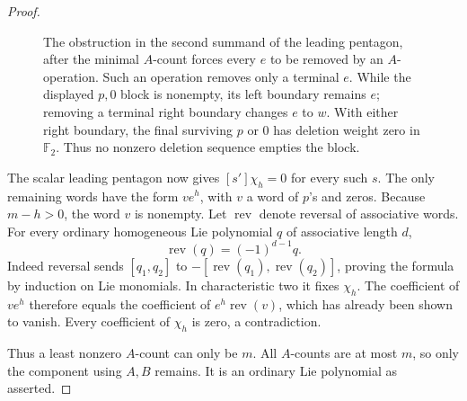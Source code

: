 \documentclass[11pt]{article}
\theoremstyle{definition}
\theoremstyle{remark}
\numberwithin{equation}{section}
\begin{document}
\begin{proof}
\begin{figure}[tbp]
  \caption{The obstruction in the second summand of the leading pentagon,
  after the minimal $A$-count forces every $e$ to be removed by an
  $A$-operation. Such an operation removes only a terminal $e$.
  While the displayed $p,0$ block is nonempty, its left boundary remains
  $e$; removing a terminal right boundary changes $e$ to $w$.
  With either right boundary, the final surviving $p$ or $0$ has deletion weight
  zero in $\mathbb F_2$. Thus no nonzero deletion sequence empties the block.}
  \label{fig:deletion-block}
\end{figure}


The scalar leading pentagon now gives $[s']\chi_h=0$ for every such
$s$.  The only remaining words have the form $v e^h$, with $v$ a word
of $p$'s and zeros.  Because $m-h>0$, the word $v$ is nonempty.  Let
$\operatorname{rev}$ denote reversal of associative words.  For every
ordinary homogeneous Lie polynomial $q$ of associative length $d$,
\[
 \operatorname{rev}(q)=(-1)^{d-1}q.
\]
Indeed reversal sends $[q_1,q_2]$ to
$-[\operatorname{rev}(q_1),\operatorname{rev}(q_2)]$, proving the
formula by induction on Lie monomials.  In characteristic two it fixes
$\chi_h$.  The coefficient of $v e^h$ therefore equals the coefficient
of $e^h\operatorname{rev}(v)$, which has already been shown to vanish.
Every coefficient of $\chi_h$ is zero, a contradiction.

Thus a least nonzero $A$-count can only be $m$.  All $A$-counts are at
most $m$, so only the component using $A,B$ remains.  It is an ordinary
Lie polynomial as asserted.
\end{proof}
\end{document}
